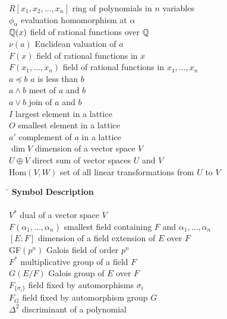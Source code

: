 \begin{tabbing}
$R[x_1, x_2, \ldots, x_n]$ \>  ring of polynomials in $n$ variables \\
$\phi_{\alpha}$ \>  evaluation homomorphism at $\alpha$ \\
${\Bbb Q}(x)$ \>  field of rational functions over ${\Bbb Q}$ \\
$\nu(a)$ \>  Euclidean valuation of $a$ \\
$F(x)$ \>  field of rational functions in $x$ \\
$F(x_1, \ldots, x_n)$ \>  field of rational functions in 
     $x_1, \ldots, x_n$ \\
$a \preceq b$ \>   $a$ is less than $b$ \\
$a \wedge b$ \>  meet of $a$ and $b$ \\
$a \vee b$ \>  join of $a$ and $b$ \\
$I$ \>  largest element in a lattice \\
$O$ \>  smallest element in a lattice \\
$a'$ \>  complement of $a$ in a lattice \\
$\dim V$ \>  dimension of a vector space $V$ \\
$U \oplus V$ \>  direct sum of vector spaces $U$ and $V$ \\
$\mbox{Hom}(V, W)$ \>  set of all linear transformations from $U$ to
     $V$ \\  
\end{tabbing} \clearpage
\begin{tabbing}
\hspace{1.9775in} \=  \kill
{\bf Symbol}  \>  {\bf Description} \\
     \mbox{\hspace*{1.0in}} \\
$V^\ast$ \>  dual of a vector space $V$ \\
$F( \alpha_1, \ldots, \alpha_n)$ \>  smallest field containing $F$ and
     $\alpha_1, \ldots, \alpha_n$ \\
$[E:F]$ \>  dimension of a field extension of $E$ over $F$ \\
GF$(p^n)$ \>  Galois field of order $p^n$ \\
$F^*$ \>  multiplicative group of a field $F$ \\
$G(E/F)$ \>  Galois group of $E$ over $F$ \\
$F_{\{\sigma_i \}}$ \>  field fixed by automorphisms $\sigma_i$ \\
$F_G$ \>  field fixed by automorphism group $G$ \\
$\Delta^2$ \>  discriminant of a polynomial \\
\end{tabbing}
 
 
 
 
